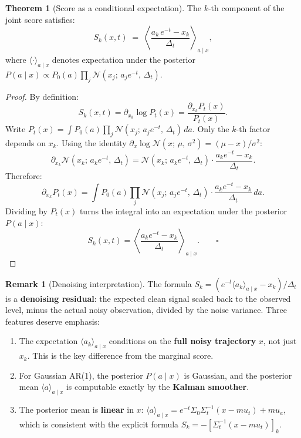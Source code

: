 \documentclass[12pt, a4paper]{article}
\def\ba{a}%
\def\bx{x}%
\def\bmu{mu}%
\def\bm#1{#1}%
\theoremstyle{definition}
\newtheorem{theorem}{Theorem}[section]
\newtheorem{remark}{Remark}[section]
\newcommand{\N}{\mathcal{N}}
\newcommand{\ba}{\bm{a}}
\newcommand{\bx}{\bm{x}}
\newcommand{\bmu}{\bm{\mu}}
\newcommand{\dt}{\Delta_t}
\begin{document}
\begin{theorem}[Score as a conditional expectation]\label{thm:mezard}
The $k$-th component of the joint score satisfies:
\[
  \boxed{
  S_k(\bx, t)
  \;=\;
  \left\langle
    \frac{a_k\,e^{-t} - x_k}{\dt}
  \right\rangle_{\!\ba \mid \bx},}
\]
where $\langle \cdot \rangle_{\ba \mid \bx}$ denotes expectation under
the posterior
$P(\ba \mid \bx) \propto P_0(\ba)\prod_{j}\N(x_j;\,a_j e^{-t},\,\dt)$.
\end{theorem}

\begin{proof}
By definition:
\[
  S_k(\bx,t)
  = \partial_{x_k}\log P_t(\bx)
  = \frac{\partial_{x_k} P_t(\bx)}{P_t(\bx)}.
\]
Write $P_t(\bx) = \int P_0(\ba)\prod_j \N(x_j;\,a_j e^{-t},\,\dt)\,d\ba$.
Only the $k$-th factor depends on $x_k$. Using the identity
$\partial_{x}\log\N(x;\,\mu,\,\sigma^2) = (\mu-x)/\sigma^2$:
\[
  \partial_{x_k}\N(x_k;\,a_k e^{-t},\,\dt)
  = \N(x_k;\,a_k e^{-t},\,\dt)\cdot\frac{a_k e^{-t} - x_k}{\dt}.
\]
Therefore:
\[
  \partial_{x_k}P_t(\bx)
  = \int P_0(\ba)\prod_j\N(x_j;\,a_j e^{-t},\,\dt)
    \cdot\frac{a_k e^{-t}-x_k}{\dt}\,d\ba.
\]
Dividing by $P_t(\bx)$ turns the integral into an expectation under
the posterior $P(\ba\mid\bx)$:
\[
  S_k(\bx,t)
  = \left\langle\frac{a_k e^{-t} - x_k}{\dt}\right\rangle_{\ba\mid\bx}.
  \qquad\square
\]
\end{proof}

\begin{remark}[Denoising interpretation]
The formula $S_k = (e^{-t}\langle a_k\rangle_{\ba\mid\bx} - x_k)/\dt$
is a \textbf{denoising residual}: the expected clean signal scaled back
to the observed level, minus the actual noisy observation, divided by
the noise variance. Three features deserve emphasis:
\begin{enumerate}
  \item The expectation $\langle a_k\rangle_{\ba\mid\bx}$ conditions on
    the \textbf{full noisy trajectory} $\bx$, not just $x_k$. This is
    the key difference from the marginal score.
  \item For Gaussian AR(1), the posterior $P(\ba\mid\bx)$ is Gaussian,
    and the posterior mean $\langle\ba\rangle_{\ba\mid\bx}$ is
    computable exactly by the \textbf{Kalman smoother}.
  \item The posterior mean is \textbf{linear} in $\bx$:
    $\langle\ba\rangle_{\ba\mid\bx} = e^{-t}\Sigma_0\Sigma_t^{-1}
    (\bx - \bmu_t) + \bmu_a$, which is consistent with the
    explicit formula $S_k = -[\Sigma_t^{-1}(\bx-\bmu_t)]_k$.
\end{enumerate}
\end{remark}
\end{document}
